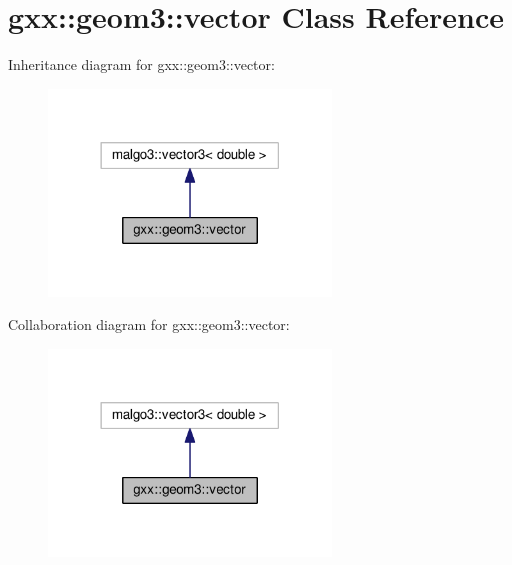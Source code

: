 \hypertarget{classgxx_1_1geom3_1_1vector}{}\section{gxx\+:\+:geom3\+:\+:vector Class Reference}
\label{classgxx_1_1geom3_1_1vector}


Inheritance diagram for gxx\+:\+:geom3\+:\+:vector\+:
\nopagebreak
\begin{figure}[H]
\begin{center}
\leavevmode
\includegraphics[width=213pt]{classgxx_1_1geom3_1_1vector__inherit__graph}
\end{center}
\end{figure}


Collaboration diagram for gxx\+:\+:geom3\+:\+:vector\+:
\nopagebreak
\begin{figure}[H]
\begin{center}
\leavevmode
\includegraphics[width=213pt]{classgxx_1_1geom3_1_1vector__coll__graph}
\end{center}
\end{figure}
